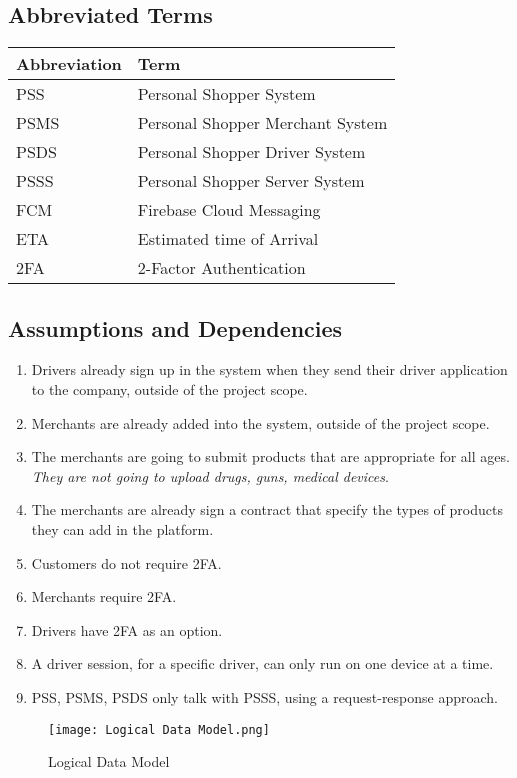 \subsection{Abbreviated Terms}
\begin{center}
    \begin{tabular}{p{}p{}}
    \hline
    \textbf{Abbreviation} & \textbf{Term} \\ 
     \hline
     PSS & Personal Shopper System \\  
     \hline
     PSMS &  Personal Shopper Merchant System \\  
     \hline
     PSDS &  Personal Shopper Driver System \\  
     \hline
     PSSS &  Personal Shopper Server System \\  
     \hline
     FCM &  Firebase Cloud Messaging \\  
     \hline
     ETA & Estimated time of Arrival \\  
     \hline
     2FA & 2-Factor Authentication  \\  
     \hline
    \end{tabular}
\end{center}

\pagebreak

\subsection{Assumptions and Dependencies}
\begin{enumerate}[label=AS-\arabic*]
    \item Drivers already sign up in the system when they send their 
    driver application to the company, outside of the project scope.
    \item Merchants are already added into the system, outside of the 
    project scope.
    \item The merchants are going to submit products that are appropriate for 
    all ages. \textit{They are not going to upload drugs, guns, 
    medical devices}.
    \item The merchants are already sign a contract that specify the types of 
    products they can add in the platform.
    \item Customers do not require 2FA.
    \item Merchants require 2FA.
    \item Drivers have 2FA as an option.
    \item A driver session, for a specific driver, can only run on one 
    device at a time.
    \item PSS, PSMS, PSDS only talk with PSSS, using a 
    request-response approach.
\end{enumerate}
\begin{figure}[!htb]
    \centering
    \texttt{[image: Logical Data Model.png]}
    \caption{Logical Data Model}
\end{figure}

